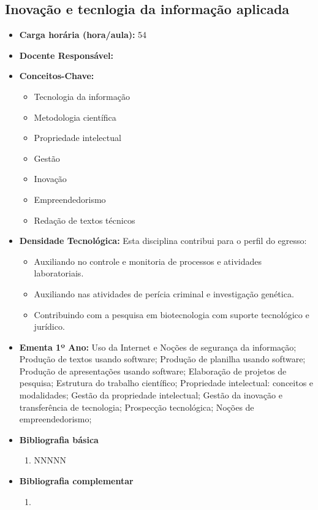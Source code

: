 \documentclass[11pt,fleqn]{book} %
\begin{document}
\subsection{Inovação e tecnlogia da informação aplicada}\label{disc:info}
\begin{itemize}
	\item \textbf{Carga horária (hora/aula):} 54
	\item \textbf{Docente Responsável:}
	\item \textbf{Conceitos-Chave:}
	\begin{itemize}
		\item Tecnologia da informação
		\item Metodologia científica
		\item Propriedade intelectual
		\item Gestão
		\item Inovação
		\item Empreendedorismo
		\item Redação de textos técnicos
	\end{itemize}
	\item \textbf{Densidade Tecnológica:} Esta disciplina contribui para o perfil do egresso:
	\begin{itemize}
		\item Auxiliando no controle e monitoria de processos e atividades laboratoriais.
		\item Auxiliando nas atividades de perícia criminal e investigação genética.
		\item Contribuindo com a pesquisa em biotecnologia com suporte tecnológico e jurídico.
	\end{itemize}
	\item \textbf{Ementa 1º Ano:}		
	Uso da Internet e Noções de segurança da informação;
	Produção de textos usando software;
	Produção de planilha usando software;
	Produção de apresentações usando software;
	Elaboração de projetos de pesquisa; 
	Estrutura do trabalho científico;
	Propriedade intelectual: conceitos e modalidades;
	Gestão da propriedade intelectual;
	Gestão da inovação e transferência de tecnologia;
	Prospecção tecnológica;
	Noções de empreendedorismo;
	
	\item \textbf{Bibliografia básica}
	\begin{enumerate}
		\item NNNNN
	\end{enumerate}
	\item \textbf{Bibliografia complementar}
	\begin{enumerate}
		\item 
	\end{enumerate}	
\end{itemize}
\end{document}

